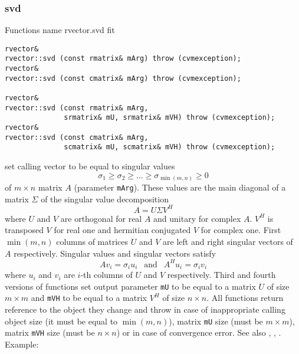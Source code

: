 \subsubsection{svd}
Functions%
\pdfdest name {rvector.svd} fit
\begin{verbatim}
rvector&
rvector::svd (const rmatrix& mArg) throw (cvmexception);
rvector&
rvector::svd (const cmatrix& mArg) throw (cvmexception);

rvector&
rvector::svd (const rmatrix& mArg,
              srmatrix& mU, srmatrix& mVH) throw (cvmexception);
rvector&
rvector::svd (const cmatrix& mArg,
              scmatrix& mU, scmatrix& mVH) throw (cvmexception);
\end{verbatim}
set calling vector to be equal to singular values
\begin{equation*}
\sigma_1\ge\sigma_2\ge\dots\ge\sigma_{\min(m,n)}\ge 0
\end{equation*}
of $m\times n$ matrix $A$ (parameter \verb"mArg").
These values are the main
diagonal of a matrix $\Sigma$ of the singular value decomposition
\begin{equation*}
A=U\Sigma V^H
\end{equation*}
where
$U$ and $V$ are orthogonal
for real $A$ and unitary for complex $A$.
$V^H$ is transposed $V$ for real one and
hermitian conjugated $V$ for complex one.
First $\min(m, n)$
columns of  matrices $U$ and $V$ are
left and right singular
vectors of $A$ respectively.
Singular values and singular vectors satisfy
\begin{equation*}
Av_i=\sigma_i u_i\ \ \text{ and }\ \ A^Hu_i=\sigma_i v_i
\end{equation*}
where $u_i$ and $v_i$ are \hbox{$i$-th}
columns of $U$ and $V$ respectively.
Third and fourth versions of  functions
set output parameter \verb"mU" to be equal
to a matrix $U$ of size $m\times m$ and
\verb"mVH" to be equal
to a matrix $V^H$ of size $n\times n$.
All  functions
return  reference to the object they change and throw
in case of inappropriate calling object size
(it must be equal to $\min(m,n)$), matrix \verb'mU' size 
(must be $m\times m$), matrix \verb'mVH' size
(must be $n\times n$) or in case of convergence error.
See also
,
,
.
Example:
